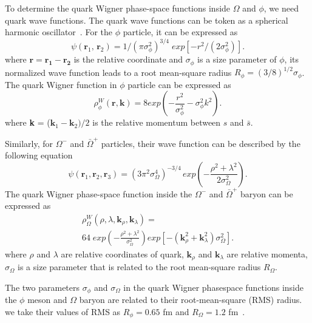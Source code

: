 \documentclass[twocolumn,aps,prc,showpacs,superscriptaddress,preprintnumbers,floatfix,nofootinbib]{revtex4}
\begin{document}
\begin{CJK*}{GBK}{song}
  To determine the quark Wigner phase-space functions inside $\Omega$ and $\phi$,
  we need quark wave functions. The quark wave functions can be token as a spherical
  harmonic oscillator~\cite{TENMB}. For the $\phi$ particle, it can be expressed as
  \begin{equation}
    \label{eq:phispherical}
    \psi(\bm{r}_{1},\,\bm{r}_{2}) = 1 / (\pi\sigma_{\phi}^{2})^{3/4}\;exp\left[-r^{2}/(2\sigma_{\phi}^{2})\right].
  \end{equation}
  where $\bm{r} = \bm{r_{1}} - \bm{r_{2}}$ is the relative coordinate and $\sigma_{\phi}$ is a size parameter
  of $\phi$, its normalized wave function
  leads to a root mean-square radius $R_{\phi} = (3/8)^{1/2}\sigma_{\phi}$. The quark
  Wigner function in $\phi$ particle can be expressed as
  \begin{equation}
    \label{eq:phiwigner}
    \rho_{\phi}^{W}(\bm{r},\bm{k}) = 8 exp\left(-\frac{r^2}{\sigma_{\phi}^2}-\sigma_{\phi}^{2}k^{2}\right).
  \end{equation}
  where \textbf{k} = ($\textbf{k}_{1}-\textbf{k}_{2})/2$ is the relative momentum
  between $s$ and $\bar{s}$.

  Similarly, for $\Omega^{-}$ and $\bar{\Omega}^{+}$ particles, their wave function
  can be described by the following equation
  \begin{equation}
    \label{eq:omegaspherical}
    \psi(\bm{r}_{1},\bm{r}_{2},\bm{r}_{3}) = (3\pi^{2}\sigma_{\Omega}^{4})^{-3/4}\,exp\left(-\frac{\rho^2+\lambda^2}{2\sigma_{\Omega}^{2}}\right).
  \end{equation}
  The quark Wigner phase-space function inside the $\Omega^{-}$ and $\bar{\Omega}^{+}$
  baryon can be expressed as
  \begin{multline}
    \label{eq:omegawigner}
    \rho_{\Omega}^{W}(\rho, \lambda, \bm{k}_{\rho}, \bm{k}_{\lambda}) = \\
    64\;exp\left(-\frac{\rho^2+\lambda^2}{\sigma_{\Omega}^{2}}\right)
    exp\left[-(\bm{k}_{\rho}^{2}+\bm{k}_{\lambda}^{2})\sigma_{\Omega}^{2}\right].
  \end{multline}
  where $\rho$ and $\lambda$ are relative coordinates of quark, $\textbf{k}_\rho$ and
  $\textbf{k}_\lambda$ are relative momenta, $\sigma_{\Omega}$ is a size parameter
  that is related to the root mean-square radius $R_{\Omega}$.

  The two parameters $\sigma_{\phi}$ and $\sigma_{\Omega}$ in the quark Wigner
  phasespace functions inside the $\phi$ meson and $\Omega$ baryon are related to
  their root-mean-square (RMS) radius. we take their values of RMS as
  $R_{\phi} = 0.65$ fm and $R_{\Omega} = 1.2$ fm~\cite{TENMB}.


\end{CJK*}
\end{document}
